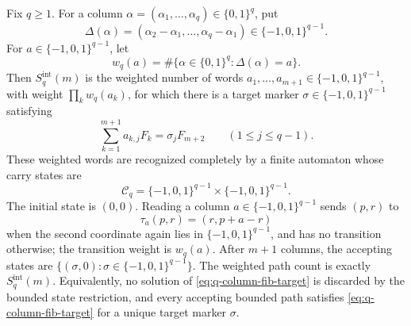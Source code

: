 \begin{lemma}
\label{lem:bounded-signed-fibonacci-carry}
\label{lem:bounded-signed-fibonacci-carry-automaton}
Fix \(q\ge1\).  For a column
\(\alpha=(\alpha_1,\ldots,\alpha_q)\in\{0,1\}^q\), put
\[
  \Delta(\alpha)=(\alpha_2-
  \alpha_1,\ldots,\alpha_q-\alpha_1)
  \in\{-1,0,1\}^{q-1}.
\]
For \(a\in\{-1,0,1\}^{q-1}\), let
\[
  w_q(a)=\#\{\alpha\in\{0,1\}^q:\Delta(\alpha)=a\}.
\]
Then \(S_q^{\mathrm{int}}(m)\) is the weighted number of words
\(a_1,\ldots,a_{m+1}\in\{-1,0,1\}^{q-1}\), with weight
\(\prod_k w_q(a_k)\), for which there is a target marker
\(\sigma\in\{-1,0,1\}^{q-1}\) satisfying
\begin{equation}\label{eq:q-column-fib-target}
  \sum_{k=1}^{m+1} a_{k,j}F_k=\sigma_jF_{m+2}
  \qquad(1\le j\le q-1).
\end{equation}
These weighted words are recognized completely by a finite automaton whose carry states are
\[
  \mathcal C_q=\{-1,0,1\}^{q-1}\times\{-1,0,1\}^{q-1}.
\]
The initial state is \((0,0)\).  Reading a column
\(a\in\{-1,0,1\}^{q-1}\) sends \((p,r)\) to
\[
  \tau_a(p,r)=(r,p+a-r)
\]
when the second coordinate again lies in \(\{-1,0,1\}^{q-1}\), and has no
transition otherwise; the transition weight is \(w_q(a)\).  After
\(m+1\) columns, the accepting states are
\(\{(\sigma,0):\sigma\in\{-1,0,1\}^{q-1}\}\).  The weighted path count is
exactly \(S_q^{\mathrm{int}}(m)\).  Equivalently, no solution of
\eqref{eq:q-column-fib-target} is discarded by the bounded state restriction,
and every accepting bounded path satisfies \eqref{eq:q-column-fib-target} for a
unique target marker \(\sigma\).
\end{lemma}

